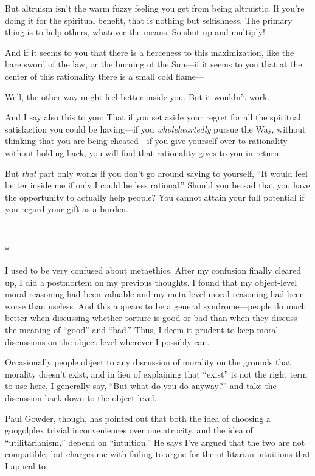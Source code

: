 {
 But altruism isn't the warm fuzzy feeling you get
from being altruistic. If you're doing it for the
spiritual benefit, that is nothing but selfishness. The primary thing
is to help others, whatever the means. So shut up and multiply!}

{
 And if it seems to you that there is a fierceness to this
maximization, like the bare sword of the law, or the burning of the
Sun---if it seems to you that at the center of this rationality there
is a small cold flame---}

{
 Well, the other way might feel better inside you. But it
wouldn't work.}

{
 And I say also this to you: That if you set aside your regret for
all the spiritual satisfaction you could be having---if you
\textit{wholeheartedly} pursue the Way, without thinking that you are
being cheated---if you give yourself over to rationality without
holding back, you will find that rationality gives to you in return.}

{
 But \textit{that} part only works if you don't go
around saying to yourself, ``It would feel better
inside me if only I could be less rational.'' Should
you be sad that you have the opportunity to actually help people? You
cannot attain your full potential if you regard your gift as a burden.}

{\centering
 \ ~
\par}

{\centering
 *
\par}


{
 I used to be very confused about metaethics. After my confusion
finally cleared up, I did a postmortem on my previous thoughts. I found
that my object-level moral reasoning had been valuable and my
meta-level moral reasoning had been worse than useless. And this
appears to be a general syndrome---people do much better when
discussing whether torture is good or bad than when they discuss the
meaning of ``good'' and
``bad.'' Thus, I deem it prudent to
keep moral discussions on the object level wherever I possibly can.}

{
 Occasionally people object to any discussion of morality on the
grounds that morality doesn't exist, and in lieu of
explaining that ``exist'' is not the
right term to use here, I generally say, ``But what do
you do anyway?'' and take the discussion back down to
the object level.}

{
 Paul Gowder, though, has pointed out that both the idea of
choosing a googolplex trivial inconveniences over one atrocity, and the
idea of ``utilitarianism,'' depend
on ``intuition.'' He says
I've argued that the two are not compatible, but
charges me with failing to argue for the utilitarian intuitions that I
appeal to.}

